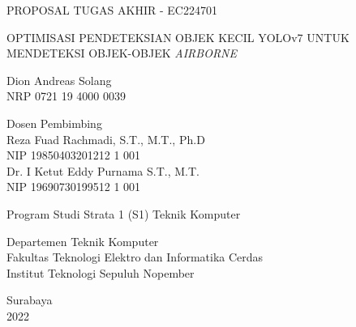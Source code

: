 \begin{large}
  PROPOSAL TUGAS AKHIR - EC224701
\end{large}

\vspace{\fill}

\begin{spacing}{1.5}
  \begin{Large}
    OPTIMISASI PENDETEKSIAN OBJEK KECIL YOLOv7
    UNTUK MENDETEKSI OBJEK-OBJEK \emph{AIRBORNE}
  \end{Large}
\end{spacing}

\vspace{\fill}

\begin{large}
  Dion Andreas Solang \\
  \textmd{NRP 0721 19 4000 0039}
\end{large}

\vspace{\fill}

\begin{large}
  \textmd{Dosen Pembimbing} \\
  Reza Fuad Rachmadi, S.T., M.T., Ph.D \\
  \textmd{NIP 19850403201212 1 001} \\
  Dr. I Ketut Eddy Purnama S.T., M.T. \\
  \textmd{NIP 19690730199512 1 001}
\end{large}

\vspace{\fill}

Program Studi Strata 1 (S1) Teknik Komputer \\

\mdseries

Departemen Teknik Komputer \\
Fakultas Teknologi Elektro dan Informatika Cerdas \\
Institut Teknologi Sepuluh Nopember

Surabaya \\
2022
